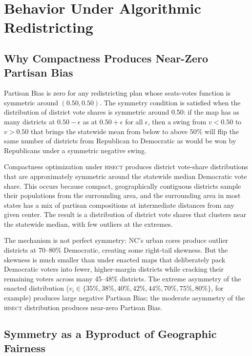\section{Behavior Under Algorithmic Redistricting}
\label{sec:behavior}

\subsection{Why Compactness Produces Near-Zero Partisan Bias}

Partisan Bias is zero for any redistricting plan whose seats-votes function is
symmetric around $(0.50, 0.50)$. The symmetry condition is satisfied when the
distribution of district vote shares is symmetric around 0.50: if the map has
as many districts at $0.50 - \epsilon$ as at $0.50 + \epsilon$ for all $\epsilon$,
then a swing from $v < 0.50$ to $v > 0.50$ that brings the statewide mean from
below to above 50\% will flip the same number of districts from Republican to
Democratic as would be won by Republicans under a symmetric negative swing.

Compactness optimization under \textsc{bisect} produces district vote-share
distributions that are approximately symmetric around the statewide median
Democratic vote share. This occurs because compact, geographically contiguous
districts sample their populations from the surrounding area, and the surrounding
area in most states has a mix of partisan compositions at intermediate distances
from any given center. The result is a distribution of district vote shares that
clusters near the statewide median, with few outliers at the extremes.

The mechanism is not perfect symmetry: NC's urban cores produce outlier districts
at 70--80\% Democratic, creating some right-tail skewness. But the skewness is
much smaller than under enacted maps that deliberately pack Democratic voters into
fewer, higher-margin districts while cracking their remaining voters across many
45--48\% districts. The extreme asymmetry of the enacted distribution ($v_i \in
\{35\%, 38\%, 40\%, 42\%, 44\%, 70\%, 75\%, 80\%\}$, for example) produces large
negative Partisan Bias; the moderate asymmetry of the \textsc{bisect} distribution
produces near-zero Partisan Bias.

\subsection{Symmetry as a Byproduct of Geographic Fairness}

